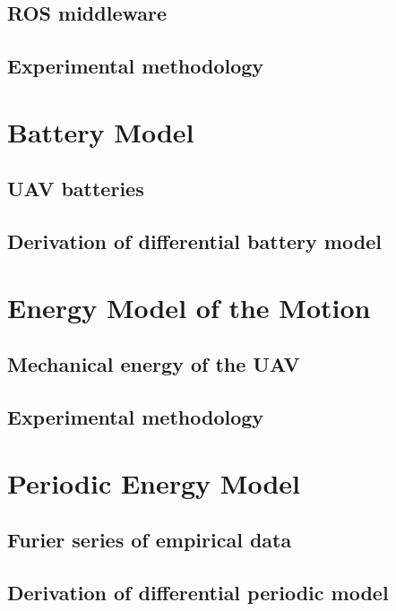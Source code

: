 \subsection{ROS middleware}

\subsection{Experimental methodology}


\section{Battery Model}

\subsection{UAV batteries}

\subsection{Derivation of differential battery model}


\section{Energy Model of the Motion}

\subsection{Mechanical energy of the UAV}

\subsection{Experimental methodology}


\section{Periodic Energy Model}

\subsection{Furier series of empirical data}

\subsection{Derivation of differential periodic model}
\label{cp:model:diff-model}

